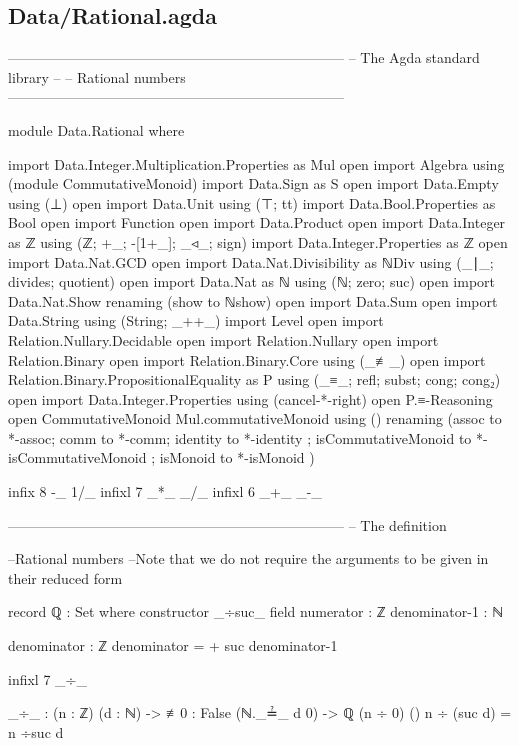 \documentclass[11pt,a4paper]{article}
\begin{document}
\subsection{Data/Rational.agda}
\begin{code}

------------------------------------------------------------------------
-- The Agda standard library
--
-- Rational numbers
------------------------------------------------------------------------

module Data.Rational where

import Data.Integer.Multiplication.Properties as Mul
open import Algebra using (module CommutativeMonoid)
import Data.Sign as S
open import Data.Empty using (⊥)
open import Data.Unit using (⊤; tt)
import Data.Bool.Properties as Bool
open import Function
open import Data.Product
open import Data.Integer as ℤ using (ℤ; +_; -[1+_]; _◃_; sign)
import Data.Integer.Properties as ℤ
open import Data.Nat.GCD
open import Data.Nat.Divisibility as ℕDiv using (_∣_; divides; quotient)
open import Data.Nat as ℕ using (ℕ; zero; suc)
open import Data.Nat.Show renaming (show to ℕshow)
open import Data.Sum
open import Data.String using (String; _++_)
import Level
open import Relation.Nullary.Decidable
open import Relation.Nullary
open import Relation.Binary
open import Relation.Binary.Core using (_≢_)
open import Relation.Binary.PropositionalEquality as P using 
  (_≡_; refl; subst; cong; cong₂)
open import Data.Integer.Properties using (cancel-*-right)
open P.≡-Reasoning
open CommutativeMonoid Mul.commutativeMonoid
  using ()
  renaming (assoc to *-assoc; comm to *-comm; identity to *-identity
           ; isCommutativeMonoid to *-isCommutativeMonoid
           ; isMonoid to *-isMonoid
           )

infix  8 -_ 1/_
infixl 7   _*_ _/_
infixl 6  _+_ _-_

------------------------------------------------------------------------
-- The definition

--Rational numbers 
--Note that we do not require the arguments to be given in their reduced form

record ℚ : Set where
  constructor _÷suc_
  field
    numerator     : ℤ
    denominator-1 : ℕ

  denominator : ℤ
  denominator = + suc denominator-1

infixl 7 _÷_

_÷_ : (n : ℤ) (d : ℕ) -> {≢0 : False (ℕ._≟_ d 0)} -> ℚ
(n ÷ 0) {()}
n ÷ (suc d) = n ÷suc d


\end{code}
\end{document}
